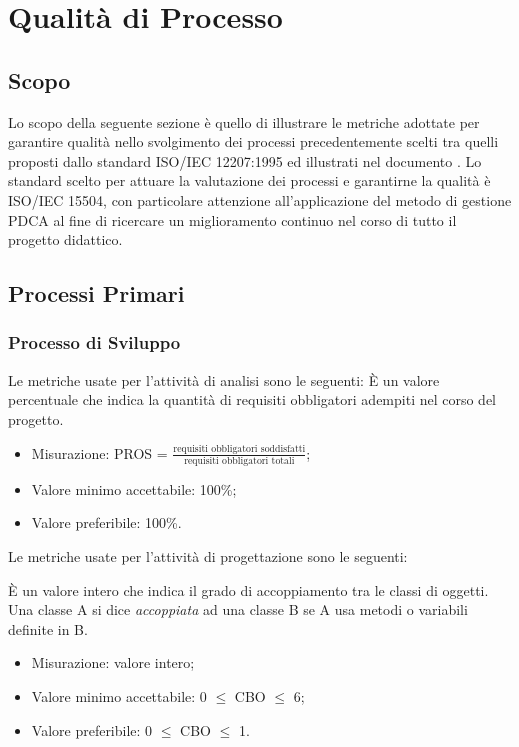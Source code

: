 \section{Qualità di Processo}

\subsection{Scopo}
Lo scopo della seguente sezione è quello di illustrare le metriche adottate per garantire qualità nello svolgimento dei processi precedentemente scelti tra quelli proposti dallo standard ISO/IEC 12207:1995 ed illustrati nel documento \textit{\NdP}. Lo standard scelto per attuare la valutazione dei processi e garantirne la qualità è ISO/IEC 15504, con particolare attenzione all'applicazione del metodo di gestione PDCA al fine di ricercare un miglioramento continuo nel corso di tutto il progetto didattico.

\subsection{Processi Primari}

	\subsubsection{Processo di Sviluppo}
	
		Le metriche usate per l'attività di analisi sono le seguenti:
			È un valore percentuale che indica la quantità di requisiti obbligatori adempiti nel corso del progetto.
			 \begin{itemize}
			\item{Misurazione: PROS = $\displaystyle\frac{\mbox{requisiti obbligatori soddisfatti}}{\mbox{requisiti obbligatori totali}}$;}
			\item{Valore minimo accettabile: 100\%;}
			\item{Valore preferibile: 100\%.}
		\end{itemize}

		Le metriche usate per l'attività di progettazione sono le seguenti:
		
			È un valore intero che indica il grado di accoppiamento tra le classi di oggetti. Una classe A si dice \textit{accoppiata} ad una classe B se A usa metodi o variabili definite in B.
		\begin{itemize}
			\item{Misurazione: valore intero;}
			\item{Valore minimo accettabile: 0 $\leq$ CBO $\leq$ 6;}
			\item{Valore preferibile: 0 $\leq$ CBO $\leq$ 1.}
		\end{itemize}

